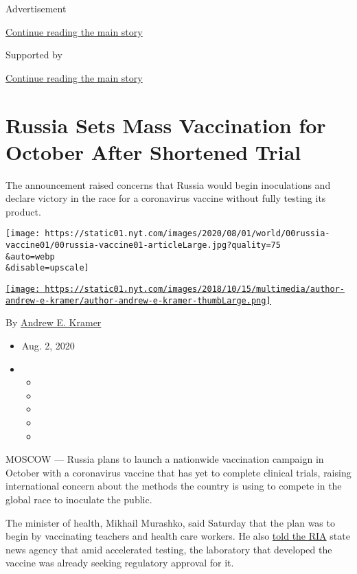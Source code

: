 Advertisement

\protect\hyperlink{after-top}{Continue reading the main story}

Supported by

\protect\hyperlink{after-sponsor}{Continue reading the main story}

\hypertarget{russia-sets-mass-vaccination-for-october-after-shortened-trial}{%
\section{Russia Sets Mass Vaccination for October After Shortened
Trial}\label{russia-sets-mass-vaccination-for-october-after-shortened-trial}}

The announcement raised concerns that Russia would begin inoculations
and declare victory in the race for a coronavirus vaccine without fully
testing its product.

\texttt{[image: https://static01.nyt.com/images/2020/08/01/world/00russia-vaccine01/00russia-vaccine01-articleLarge.jpg?quality=75\\\&auto=webp\\\&disable=upscale]}

\href{https://www.nytimes.com/by/andrew-e-kramer}{\texttt{[image: https://static01.nyt.com/images/2018/10/15/multimedia/author-andrew-e-kramer/author-andrew-e-kramer-thumbLarge.png]}}

By \href{https://www.nytimes.com/by/andrew-e-kramer}{Andrew E. Kramer}

\begin{itemize}
\item
  Aug. 2, 2020
\item
  \begin{itemize}
  \item
  \item
  \item
  \item
  \item
  \end{itemize}
\end{itemize}

MOSCOW --- Russia plans to launch a nationwide vaccination campaign in
October with a coronavirus vaccine that has yet to complete clinical
trials, raising international concern about the methods the country is
using to compete in the global race to inoculate the public.

The minister of health, Mikhail Murashko, said Saturday that the plan
was to begin by vaccinating teachers and health care workers. He also
\href{https://ria.ru/20200801/1575248763.html}{told the RIA} state news
agency that amid accelerated testing, the laboratory that developed the
vaccine was already seeking regulatory approval for it.

